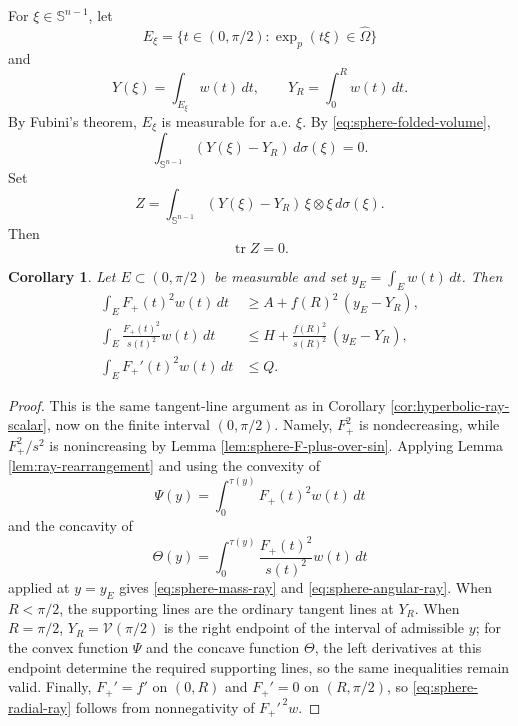 \documentclass[11pt]{amsart}
\newtheorem{corollary}[theorem]{Corollary}
\theoremstyle{remark}
\DeclareMathOperator{\tr}{tr}
\newcommand{\Sn}{\mathbb S}
\begin{document}
For $\xi\in\Sn^{n-1}$, let
$$
        E_\xi=\{t\in(0,\pi/2):\exp_p(t\xi)\in\widehat\Omega\}
$$
and
$$
        Y(\xi)=\int_{E_\xi}w(t)\,dt,
        \qquad
        Y_R=\int_0^R w(t)\,dt.
$$
By Fubini's theorem, $E_\xi$ is measurable for a.e. $\xi$.  By \eqref{eq:sphere-folded-volume},
\begin{equation}\label{eq:sphere-delta-zero}
        \int_{\Sn^{n-1}}(Y(\xi)-Y_R)\,d\sigma(\xi)=0.
\end{equation}
Set
\begin{equation}\label{eq:sphere-Z-def}
        Z=\int_{\Sn^{n-1}}(Y(\xi)-Y_R)\,\xi\otimes\xi\,d\sigma(\xi).
\end{equation}
Then
\begin{equation}\label{eq:sphere-Z-trace-zero}
        \tr Z=0.
\end{equation}

\begin{corollary}\label{cor:sphere-ray-scalar}
Let $E\subset(0,\pi/2)$ be measurable and set $y_E=\int_Ew(t)\,dt$.  Then
\begin{align}
        \int_E F_+(t)^2w(t)\,dt
        &\ge A+f(R)^2\,(y_E-Y_R),
        \label{eq:sphere-mass-ray}\\
        \int_E \frac{F_+(t)^2}{s(t)^2}w(t)\,dt
        &\le H+\frac{f(R)^2}{s(R)^2}\,(y_E-Y_R),
        \label{eq:sphere-angular-ray}\\
        \int_E F_+'(t)^2w(t)\,dt
        &\le Q.
        \label{eq:sphere-radial-ray}
\end{align}
\end{corollary}

\begin{proof}
This is the same tangent-line argument as in Corollary \ref{cor:hyperbolic-ray-scalar}, now on the finite interval $(0,\pi/2)$.  Namely, $F_+^2$ is nondecreasing, while $F_+^2/s^2$ is nonincreasing by Lemma \ref{lem:sphere-F-plus-over-sin}.  Applying Lemma \ref{lem:ray-rearrangement} and using the convexity of
$$
        \Psi(y)=\int_0^{\tau(y)}F_+(t)^2w(t)\,dt
$$
and the concavity of
$$
        \Theta(y)=\int_0^{\tau(y)}\frac{F_+(t)^2}{s(t)^2}w(t)\,dt
$$
applied at $y=y_E$ gives \eqref{eq:sphere-mass-ray} and \eqref{eq:sphere-angular-ray}.  When $R<\pi/2$, the supporting lines are the ordinary tangent lines at $Y_R$.  When $R=\pi/2$, $Y_R=\mathcal V(\pi/2)$ is the right endpoint of the interval of admissible $y$; for the convex function $\Psi$ and the concave function $\Theta$, the left derivatives at this endpoint determine the required supporting lines, so the same inequalities remain valid.  Finally, $F_+'=f'$ on $(0,R)$ and $F_+'=0$ on $(R,\pi/2)$, so \eqref{eq:sphere-radial-ray} follows from nonnegativity of $F_+'^{\,2}w$.
\end{proof}
\end{document}
